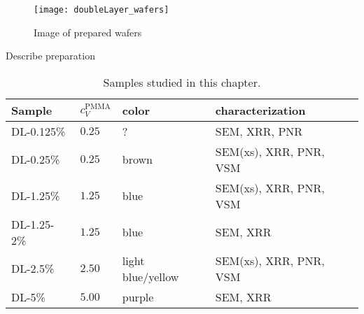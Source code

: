 \documentclass[\main/dresen_thesis.tex]{subfiles}
\begin{document}
  \begin{figure}[tb]
    \centering
    \texttt{[image: doubleLayer\_wafers]}
    \caption{\label{fig:doubleLayers:preparation:waferImage}Image of prepared wafers}
  \end{figure}

  Describe preparation

  \begin{table}[!htbp]
    \centering
    \caption{\label{tab:doubleLayers:preparation:samples}Samples studied in this chapter.}
    \begin{tabular}{ l | l | l | l}
      \textbf{Sample}  & $c_V^\mathrm{PMMA}$ & color & characterization\\
      \hline
      DL-0.125\%    & $0.25$ & ?                & SEM, XRR, PNR\\
      DL-0.25\%     & $0.25$ & brown            & SEM(xs), XRR, PNR, VSM\\
      DL-1.25\%     & $1.25$ & blue             & SEM(xs), XRR, PNR, VSM\\
      DL-1.25-2\%   & $1.25$ & blue             & SEM, XRR\\
      DL-2.5\%      & $2.50$ & light blue/yellow& SEM(xs), XRR, PNR, VSM\\
      DL-5\%        & $5.00$ & purple           & SEM, XRR\\
      \hline
    \end{tabular}
  \end{table}

\end{document}
